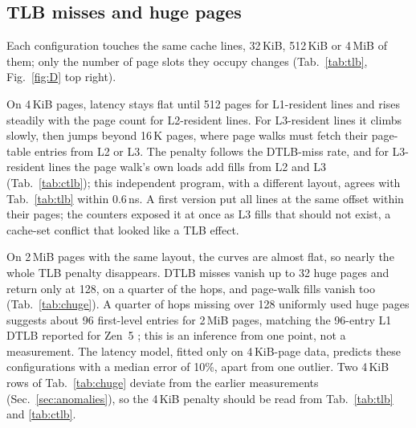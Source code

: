 \documentclass{article}
\begin{document}
\subsection{TLB misses and huge pages}\label{sec:tlb}
\begin{table}[!htb]\centering\small
\caption{The same cache lines spread over more page slots, dependent chase, on 4\,KiB and 2\,MiB pages with identical layout and visiting order. The two arms alternate repetition by repetition; medians of 7. The penalty is the most-pages time minus the fewest-pages time.}\label{tab:tlb}\end{table}
\begin{table}[!htb]\centering\small\resizebox{0.9\linewidth}{!}{}
\caption{The same cache lines over more 4\,KiB pages, with counters. Every in-page line offset is used equally often to keep the cache-set mapping balanced; 4\,MiB rows are medians of 3 runs.}\label{tab:ctlb}\end{table}
\begin{table}[!htb]\centering\small\resizebox{0.9\linewidth}{!}{}
\caption{Hardware counters on 4\,KiB and 2\,MiB pages, with the same cache lines on the same randomly permuted page slots, dependent chase. In the 4\,MiB rows one L3 fill per hop is the data line itself; the excess on 4\,KiB pages is page-table traffic.}\label{tab:chuge}\end{table}
Each configuration touches the same cache lines, 32\,KiB, 512\,KiB or 4\,MiB of them; only the number of page slots they occupy changes (Tab.~\ref{tab:tlb}, Fig.~\ref{fig:D} top right).

On 4\,KiB pages, latency stays flat until 512 pages for L1-resident lines and rises steadily with the page count for L2-resident lines. For L3-resident lines it climbs slowly, then jumps beyond 16\,K pages, where page walks must fetch their page-table entries from L2 or L3. The penalty follows the DTLB-miss rate, and for L3-resident lines the page walk's own loads add fills from L2 and L3 (Tab.~\ref{tab:ctlb}); this independent program, with a different layout, agrees with Tab.~\ref{tab:tlb} within 0.6\,ns. A first version put all lines at the same offset within their pages; the counters exposed it at once as L3 fills that should not exist, a cache-set conflict that looked like a TLB effect.

On 2\,MiB pages with the same layout, the curves are almost flat, so nearly the whole TLB penalty disappears. DTLB misses vanish up to 32 huge pages and return only at 128, on a quarter of the hops, and page-walk fills vanish too (Tab.~\ref{tab:chuge}). A quarter of hops missing over 128 uniformly used huge pages suggests about 96 first-level entries for 2\,MiB pages, matching the 96-entry L1 DTLB reported for Zen~5 \cite{amdhc}; this is an inference from one point, not a measurement. The latency model, fitted only on 4\,KiB-page data, predicts these configurations with a median error of 10\%, apart from one outlier. Two 4\,KiB rows of Tab.~\ref{tab:chuge} deviate from the earlier measurements (Sec.~\ref{sec:anomalies}), so the 4\,KiB penalty should be read from Tab.~\ref{tab:tlb} and \ref{tab:ctlb}.
\end{document}
